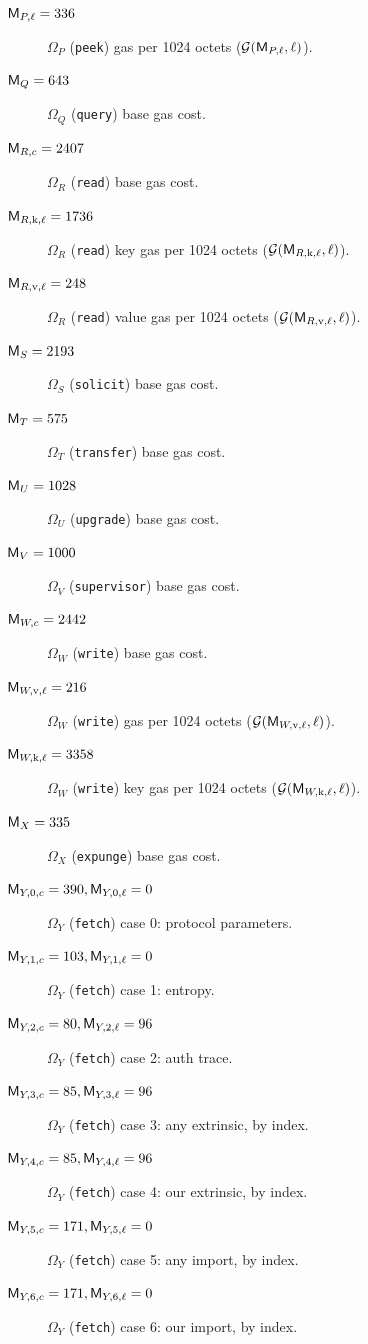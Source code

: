 \begin{description}
  \item[$\mathsf{M}_{P,\ell} = 336$] $\Omega_P$ (\texttt{peek}) gas per 1024 octets ($\mathcal{G}(\mathsf{M}_{P,\ell}, \ell)$).
  \item[$\mathsf{M}_Q = 643$] $\Omega_Q$ (\texttt{query}) base gas cost.
  \item[$\mathsf{M}_{R,c} = 2407$] $\Omega_R$ (\texttt{read}) base gas cost.
  \item[$\mathsf{M}_{R,\mathrm{k},\ell} = 1736$] $\Omega_R$ (\texttt{read}) key gas per 1024 octets ($\mathcal{G}(\mathsf{M}_{R,\mathrm{k},\ell}, \ell)$).
  \item[$\mathsf{M}_{R,\mathrm{v},\ell} = 248$] $\Omega_R$ (\texttt{read}) value gas per 1024 octets ($\mathcal{G}(\mathsf{M}_{R,\mathrm{v},\ell}, \ell)$).
  \item[$\mathsf{M}_S = 2193$] $\Omega_S$ (\texttt{solicit}) base gas cost.
  \item[$\mathsf{M}_T = 575$] $\Omega_T$ (\texttt{transfer}) base gas cost.
  \item[$\mathsf{M}_U = 1028$] $\Omega_U$ (\texttt{upgrade}) base gas cost.
  \item[$\mathsf{M}_V = 1000$] $\Omega_V$ (\texttt{supervisor}) base gas cost.
  \item[$\mathsf{M}_{W,c} = 2442$] $\Omega_W$ (\texttt{write}) base gas cost.
  \item[$\mathsf{M}_{W,\mathrm{v},\ell} = 216$] $\Omega_W$ (\texttt{write}) gas per 1024 octets ($\mathcal{G}(\mathsf{M}_{W,\mathrm{v},\ell}, \ell)$).
  \item[$\mathsf{M}_{W,\mathrm{k},\ell} = 3358$] $\Omega_W$ (\texttt{write}) key gas per 1024 octets ($\mathcal{G}(\mathsf{M}_{W,\mathrm{k},\ell}, \ell)$).
  \item[$\mathsf{M}_X = 335$] $\Omega_X$ (\texttt{expunge}) base gas cost.
  \item[$\mathsf{M}_{Y,0,c} = 390, \mathsf{M}_{Y,0,\ell} = 0$] $\Omega_Y$ (\texttt{fetch}) case 0: protocol parameters.
  \item[$\mathsf{M}_{Y,1,c} = 103, \mathsf{M}_{Y,1,\ell} = 0$] $\Omega_Y$ (\texttt{fetch}) case 1: entropy.
  \item[$\mathsf{M}_{Y,2,c} = 80, \mathsf{M}_{Y,2,\ell} = 96$] $\Omega_Y$ (\texttt{fetch}) case 2: auth trace.
  \item[$\mathsf{M}_{Y,3,c} = 85, \mathsf{M}_{Y,3,\ell} = 96$] $\Omega_Y$ (\texttt{fetch}) case 3: any extrinsic, by index.
  \item[$\mathsf{M}_{Y,4,c} = 85, \mathsf{M}_{Y,4,\ell} = 96$] $\Omega_Y$ (\texttt{fetch}) case 4: our extrinsic, by index.
  \item[$\mathsf{M}_{Y,5,c} = 171, \mathsf{M}_{Y,5,\ell} = 0$] $\Omega_Y$ (\texttt{fetch}) case 5: any import, by index.
  \item[$\mathsf{M}_{Y,6,c} = 171, \mathsf{M}_{Y,6,\ell} = 0$] $\Omega_Y$ (\texttt{fetch}) case 6: our import, by index.

\end{description}
